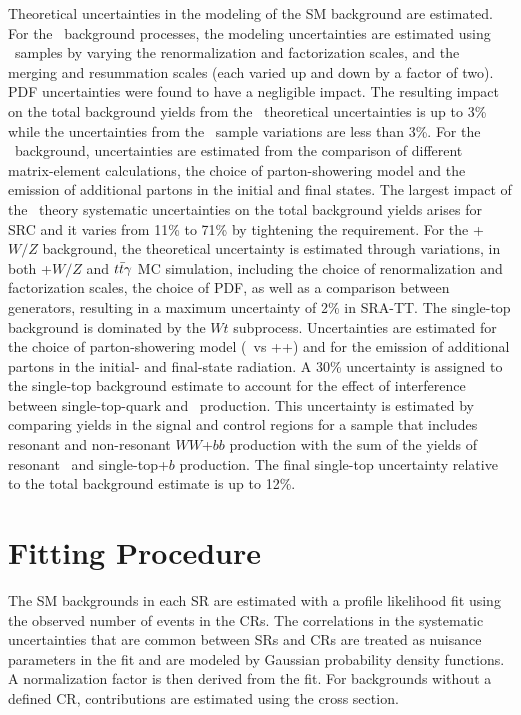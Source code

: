 Theoretical uncertainties in the modeling of the SM background are
estimated. For the \Vjets\ background processes, the modeling uncertainties
are estimated using \sherpa\ samples by varying the renormalization and
factorization scales, and the merging 
and resummation
scales (each varied up and down by a
factor of two). PDF uncertainties were found to have a negligible impact. The resulting impact on the total background yields from the
\Zjets\ theoretical uncertainties is up to 3\% while the uncertainties from the \Wjets\ sample variations are less than 3\%.  For the \ttbar\ background, uncertainties are estimated from the
comparison of different matrix-element calculations, the choice of parton-showering model and
the emission of additional partons in the initial and final
states. 
The largest impact of the \ttbar\ theory
systematic uncertainties on the total background yields arises for SRC and it
varies from 11\% to 71\% by tightening the \RISR requirement. For the \ttbar+$W/Z$ background, the theoretical uncertainty is
estimated through variations, in both \ttbar+$W/Z$ and $t\bar{t}\gamma$ MC simulation, including the choice of
renormalization and factorization scales, the choice of PDF, as well as a comparison between generators, resulting in a maximum uncertainty of 2\% in SRA-TT.
The single-top background is dominated by the $Wt$ subprocess. Uncertainties are estimated for
the choice of parton-showering model (\pythia\ vs \herwig++) and
for the emission of additional partons in the initial- and final-state
radiation. A 30\% uncertainty is assigned to the single-top background estimate to account for the effect of
interference between single-top-quark and \ttbar\ production. This uncertainty is estimated by comparing yields in the signal and control 
regions for a sample that includes resonant and non-resonant $WW$+$bb$ production with the sum of the yields of 
resonant \ttbar\ and single-top+$b$ production. The
final single-top uncertainty relative to the total background estimate
is up to 12\%.



\section{Fitting Procedure}
\label{sec:fitting}

The SM backgrounds in each SR are estimated with a profile likelihood fit using the observed number of events in the CRs.  The correlations in the systematic uncertainties that are common between SRs and CRs  are treated as nuisance parameters in the fit and are modeled by Gaussian probability density functions.  A normalization factor is then derived from the fit.  For backgrounds without a defined CR, contributions are estimated using the cross section.  \\



